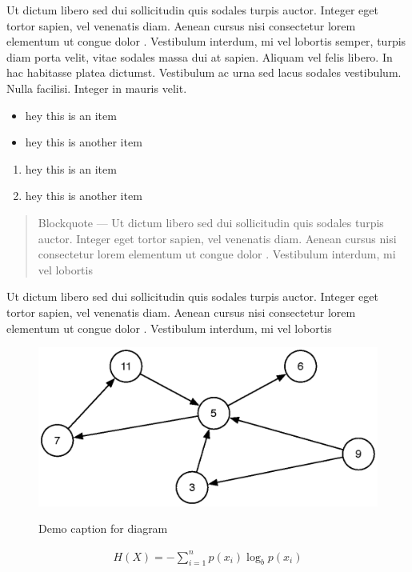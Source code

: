 Ut dictum libero sed dui sollicitudin quis sodales turpis auctor.
Integer eget tortor sapien, vel venenatis diam. Aenean cursus nisi
consectetur lorem elementum ut congue dolor . Vestibulum interdum, mi
vel lobortis semper, turpis diam porta velit, vitae sodales massa dui at
sapien. Aliquam vel felis libero. In hac habitasse platea dictumst.
Vestibulum ac urna sed lacus sodales vestibulum. Nulla facilisi. Integer
in mauris velit.

\begin{itemize}
\item
  hey this is an item
\item
  hey this is another item
\end{itemize}

\begin{enumerate}
\item
  hey this is an item
\item
  hey this is another item
\end{enumerate}

\begin{quote}
Blockquote --- Ut dictum libero sed dui sollicitudin quis sodales turpis
auctor. Integer eget tortor sapien, vel venenatis diam. Aenean cursus
nisi consectetur lorem elementum ut congue dolor . Vestibulum interdum,
mi vel lobortis
\end{quote}

Ut dictum libero sed dui sollicitudin quis sodales turpis auctor.
Integer eget tortor sapien, vel venenatis diam. Aenean cursus nisi
consectetur lorem elementum ut congue dolor . Vestibulum interdum, mi
vel lobortis

\begin{figure}[H]
  \centering
     \includegraphics[scale=0.6]{demo-diagram.eps}
  \label{fig:demo-diagram}
  \caption{Demo caption for diagram}
\end{figure}

\begin{align}
H(X) = - \sum_{i=1}^{n}p(x_i)\log_bp(x_i)
\end{align}
